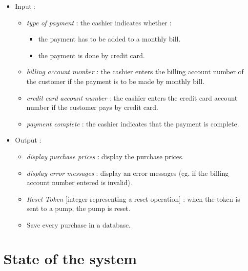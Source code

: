 \documentclass[11pt, a4paper]{article}
\newcommand{\data}[1]{\textit{#1}}
\begin{document}
\begin{itemize}
\item Input :
		\begin{itemize}
		\item \data{type of payment} : the cashier indicates whether : 
					\begin{itemize}
					\item the payment has to be added to a monthly bill.
					\item the payment is done by credit card.
					\end{itemize}
		\item \data{billing account number} : the cashier enters the billing account number of the customer if the payment is to be made by monthly bill.
		\item \data{credit card account number} : the cashier enters the credit card account number if the customer pays by credit card.
		\item \data{payment complete} : the cashier indicates that the payment is complete.
		\end{itemize}

\item Output :
		\begin{itemize}
		\item \data{display purchase prices} : display the purchase prices.
		\item \data{display error messages} : display an error messages (eg. if the billing account number entered is invalid).
    \item \data{Reset Token} [integer representing a reset operation] : when the token is sent to a pump, the pump is reset.
    \item Save every purchase in a database.
		\end{itemize}
\end{itemize}



\section{State of the system}
\end{document}
